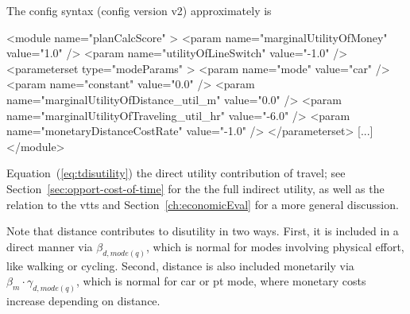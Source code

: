 %
The config syntax (config version v2) approximately is
\begin{xml}
<module name="planCalcScore" >
   <param name="marginalUtilityOfMoney" value="1.0" />
   <param name="utilityOfLineSwitch" value="-1.0" />
   <parameterset type="modeParams" >
      <param name="mode" value="car" />
      <param name="constant" value="0.0" />
      <param name="marginalUtilityOfDistance_util_m" value="0.0" />
      <param name="marginalUtilityOfTraveling_util_hr" value="-6.0" />
      <param name="monetaryDistanceCostRate" value="-1.0" />
   </parameterset>
   [...]    
</module>
\end{xml}

%
Equation~(\ref{eq:tdisutility}) the direct utility contribution of travel; see Section~\ref{sec:opport-cost-of-time} for the the full indirect utility, as well as the relation to the \gls{vtts} and Section~\ref{ch:economicEval} for a more general discussion.

Note that distance contributes to disutility in two ways. First, it is included in a direct manner via $\beta_{d, mode(q)}$, which is normal for modes involving physical effort, like walking or cycling. Second, distance is also included monetarily via $\beta_m \cdot \gamma_{d, mode(q)}$, which is normal for car or pt mode, where monetary costs increase depending on distance.




